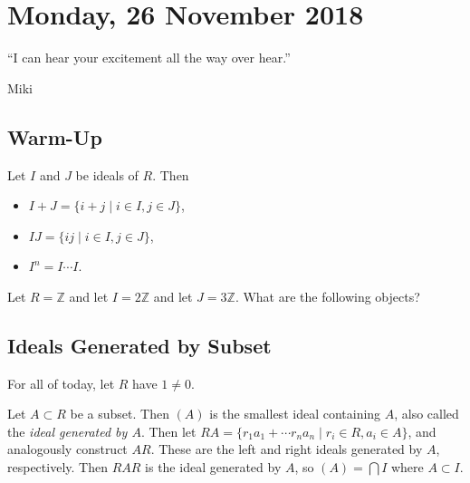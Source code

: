 \section{Monday, 26 November 2018}

\epigraph{``I can hear your excitement all the way over hear.''}{Miki}

\subsection{Warm-Up}

Let $I$ and $J$ be ideals of $R$. Then 
\begin{itemize}
\item $I +J = \{i+j \mid i \in I, j \in J\}$,
\item $IJ = \{ij \mid i \in I, j \in J\}$,
\item $I^n = I \cdots I$.
\end{itemize}

\begin{problem}[Warm-Up]
Let $R = \mathbb{Z}$ and let $I = 2\mathbb{Z}$ and let $J = 3\mathbb{Z}$.
What are the following objects?
\end{problem}

\subsection{Ideals Generated by Subset}

For all of today, let $R$ have $1 \not= 0$.

\begin{definition}
Let $A \subset R$ be a subset. Then $(A)$ is the smallest ideal containing $A$, also called the \emph{ideal generated by $A$}. Then let $RA = \{r_1a_1 + \cdots r_na_n \mid r_i \in R, a_i \in A\}$, and analogously construct $AR$. These are the left and right ideals generated by $A$, respectively. Then $RAR$ is the ideal generated by $A$, so $(A) = \bigcap I$ where $A \subset I$.
\end{definition}

